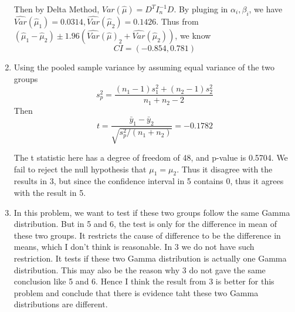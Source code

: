 \documentclass{article}
\begin{document}
\begin{enumerate}[leftmargin = 0 em, label = \arabic*., font = \bfseries]
    Then by Delta Method, $Var(\hat{\mu}) = D^T I_n^{-1} D$.  By pluging in $\alpha_i, \beta_i$, we have $\hat{Var}(\hat{\mu}_1) = 0.0314, \hat{Var}(\hat{\mu}_2) = 0.1426$. Thus from $(\hat{\mu}_1 - \hat{\mu}_2) \pm 1.96 (\hat{Var}(\hat{\mu})_2 + \hat{Var}(\hat{\mu}_2))$, we know
    \[CI = (-0.854, 0.781)\]


    \item 
    Using the pooled sample variance by assuming equal variance of the two groups
    \[s^2_p = \frac{(n_1 - 1)s^2_1 + (n_2 - 1)s_2^2}{n_1 + n_2 - 2}\]
    Then 
    \[t = \frac{\bar{y}_1 - \bar{y}_2}{\sqrt{s_p^2/(n_1 + n_2)}} = -0.1782\]

    The t statistic here has a degree of freedom of 48, and p-value is 0.5704. We fail to reject the null hypothesis that $\mu_1 = \mu_2$. Thus it disagree with the results in 3, but since the confidence interval in 5 contains 0, thus it agrees with the result in 5. 


    \item 
    In this problem, we want to test if these two groups follow the same Gamma distribution. But in 5 and 6, the test is only for the difference in mean of these two groups. It restricts the cause of difference to be the difference in means, which I don't think is reasonable. In 3 we do not have such restriction. It tests if these two Gamma distribution is actually one Gamma distribution. This may also be the reason why 3 do not gave the same conclusion like 5 and 6. Hence I think the result from 3 is better for this problem and conclude that there is evidence taht these two Gamma distributions are different.


 	\end{enumerate}


	
	
	
	
\end{document}
